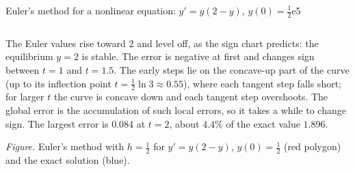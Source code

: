 \documentclass[11pt]{article}
\begin{document}
\begin{exmp}{Euler's method for a nonlinear equation: $y'=y(2-y)$, $y(0)=\frac12$}{e5}
\begin{center}
\begin{tabular}{ccccrr}
\end{tabular}
\end{center}
The Euler values rise toward $2$ and level off, as the sign chart predicts: the equilibrium $y=2$ is stable. The error is negative at first and changes sign between $t=1$ and $t=1.5$. The early steps lie on the concave-up part of the curve (up to its inflection point $t=\frac12\ln3\approx0.55$), where each tangent step falls short; for larger $t$ the curve is concave down and each tangent step overshoots. The global error is the accumulation of such local errors, so it takes a while to change sign. The largest error is $0.084$ at $t=2$, about $4.4\%$ of the exact value $1.896$.
\begin{center}
\par\small\emph{Figure.} Euler's method with $h=\frac12$ for $y'=y(2-y)$, $y(0)=\frac12$ (red polygon) and the exact solution (blue).
\end{center}
\end{exmp}
\end{document}
